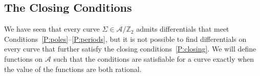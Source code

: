 \documentclass{article}
\begin{document}










\subsection{The Closing Conditions}\label{sub:Closing Conditions}
We have seen that every curve $\Sigma\in\mathcal{A}/\mathbb{Z}_2$ admits differentials that meet Conditions~\ref{P:poles}--\ref{P:periods}, but it is not possible to find differentials on every curve that further satisfy the closing conditions~\ref{P:closing}. We will define functions on $\mathcal{A}$ such that the conditions are satisfiable for a curve exactly when the value of the functions are both rational.
\end{document}
